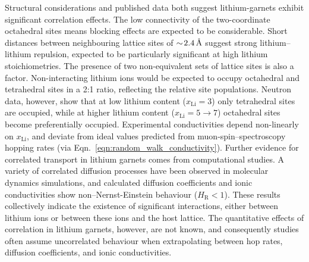 \documentclass[aps,prb,twocolumn,superscriptaddress,reprint]{revtex4-1}
\newcommand{\xLi}{x_\m{Li}}
\newcommand{\angstrom}{\mbox{\normalfont\AA}}
\newcommand{\m}[1]{\mathrm{#1}}
\begin{document}
Structural considerations and published data both suggest lithium-garnets  exhibit significant correlation effects. The low connectivity of the two-coordinate octahedral sites means blocking effects are expected to be considerable.\cite{AwakaEtAl_ChemLett2011} Short distances between neighbouring lattice sites of $\sim\!2.4\,\mathrm{\angstrom}$ suggest strong lithium--lithium repulsion, expected to be particularly significant at high lithium stoichiometries.\cite{OCallaghanAndCussen_ChemComm2007,OCallaghanAndCussen_SolStatSci2008,Cussen_JMaterChem2010,WangEtAl_SolStatIonics2014} The presence of two non-equivalent sets of lattice sites is also a factor. Non-interacting lithium ions would be expected to occupy octahedral and tetrahedral sites in a 2:1 ratio, reflecting the relative site populations. 
Neutron data, however, show that at low lithium content ($\xLi=3$) only tetrahedral sites are occupied,\cite{OCallaghanEtAl_ChemMater2006} while at higher lithium content ($\xLi=5\to7$) octahedral sites become preferentially occupied.\cite{Cussen_JMaterChem2010,ThangaduraiEtAl_JPhysChemLett2015} Experimental conductivities depend non-linearly on $\xLi$,\cite{ThompsonEtAl_AdvEnergyMater2015} and deviate from ideal values predicted from muon-spin--spectroscopy hopping rates (via Eqn.~\ref{eqn:random_walk_conductivity}).\cite{NozakiEtAl_SolStatIonics2014} Further evidence for correlated transport in lithium garnets comes from computational studies. A variety of correlated diffusion processes have been observed in molecular dynamics simulations,\cite{JalemEtAl_ChemMater2013, MeierEtAl_JPhysChemC2014,KlenkAndLai_PhysChemChemPhys2015, BurbanoEtAl_PhysRevLett2016} and calculated diffusion coefficients and ionic conductivities show non--Nernst-Einstein behaviour ($H_\m{R}<1$).\cite{KlenkAndLai_SolStatIonics2016} These results collectively indicate the existence of significant interactions, either between lithium ions or between these ions and the host lattice. The quantitative effects of correlation in lithium garnets, however, are not known, and consequently studies often assume uncorrelated behaviour when extrapolating between hop rates, diffusion coefficients, and ionic conductivities.\cite{KuhnEtAl_PhysRevB2011,KuhnEtAl_JPhys-CondensMat2011,MiaraEtAl_ChemMater2013,Rustad_arXiv2016,GuEtAl_SolStatIonics2015,NozakiEtAl_SolStatIonics2014,ZeierEtAl_ACSApplMaterInt2014,JalemEtAl_ChemMater2013,AdamsAndRao_JMaterChem2012,DuvelEtAl_JPhysChemC2012,NarayananEtAl_RSCAdv2012,RamzyAndThangadurai_ACSApplMaterInt2010,AmoresEtAl_JMaterChemA2016}
\end{document}

